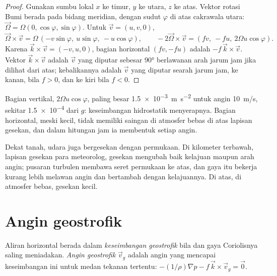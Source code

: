 \begin{proof}
Gunakan sumbu lokal $x$ ke timur, $y$ ke utara, $z$ ke atas. Vektor rotasi Bumi berada pada bidang meridian,
dengan sudut $\varphi$ di atas cakrawala utara: $\vec\Omega =
\Omega(0, \cos\varphi, \sin\varphi)$. Untuk $\vec v = (u, v, 0)$,
\[
  \vec\Omega\times\vec v = \Omega\,(-v\sin\varphi,\ u\sin\varphi,\ -u\cos\varphi),
  \qquad -2\vec\Omega\times\vec v = (f v,\ -f u,\ 2\Omega u\cos\varphi).
\]
Karena $\vec k\times\vec v = (-v, u, 0)$, bagian horizontal $(fv, -fu)$ adalah
$-f\,\vec k\times\vec v$. Vektor $\vec k\times\vec v$ adalah $\vec v$ yang diputar sebesar
\ang{90} berlawanan arah jarum jam jika dilihat dari atas; kebalikannya adalah $\vec v$ yang diputar searah jarum jam,
ke kanan, bila $f > 0$, dan ke kiri bila $f < 0$.
\end{proof}

Bagian vertikal, $2\Omega u\cos\varphi$, paling besar \qty{1.5e-3}{m.s^{-2}} untuk angin \qty{10}{m/s}, sekitar \num{1.5e-4} dari $g$: keseimbangan hidrostatik menyerapnya. Bagian horizontal, meski kecil, tidak memiliki saingan di atmosfer bebas di atas lapisan gesekan, dan dalam hitungan jam ia membentuk setiap angin.

Dekat tanah, udara juga bergesekan dengan permukaan. Di kilometer terbawah, lapisan gesekan para meteorolog, gesekan mengubah baik kelajuan maupun arah angin; pusaran turbulen membawa seret permukaan ke atas, dan gaya itu bekerja kurang lebih melawan angin dan bertambah dengan kelajuannya. Di atas, di atmosfer bebas, gesekan kecil.

\section{Angin geostrofik}\label{sec:b1:atmospheric-circulation:geostrophic}

\begin{definition}\label{def:b1:atmospheric-circulation:geostrophic}
Aliran horizontal berada dalam \emph{keseimbangan geostrofik} bila  dan gaya Coriolisnya saling meniadakan. \emph{Angin geostrofik} $\vec v_g$ adalah angin yang mencapai keseimbangan ini untuk medan tekanan tertentu: $-(1/\rho)\nabla p - f\,\vec k\times\vec v_g = \vec 0$.
\end{definition}

